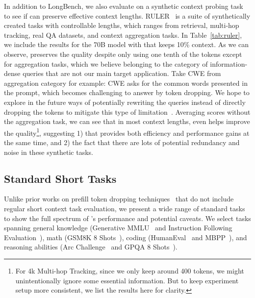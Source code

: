 In addition to LongBench, we also evaluate \ours{} on a synthetic context probing task to see if \ours{} can preserve effective context lengths. RULER~\cite{hsieh2024ruler} is a suite of synthetically created tasks with controllable lengths, which ranges from retrieval, multi-hop tracking, real QA datasets, and context aggregation tasks. In Table~\ref{tab:ruler}, we include the results for the 70B model with \ours{} that keeps 10\% context. As we can observe, \ours{} preserves the quality despite only using one tenth of the tokens except for aggregation tasks, which we believe belonging to the category of information-dense queries that are not our main target application. Take CWE from aggregation category for example: CWE asks for the common words presented in the prompt, which becomes challenging to answer by token dropping. We hope to explore in the future ways of potentially rewriting the queries instead of directly dropping the tokens to mitigate this type of limitation~\cite{jiang2023llmlinguacompressingpromptsaccelerated, jiang2024longllmlinguaacceleratingenhancingllms}. Averaging scores without the aggregation task, we can see that in most context lengths, \ours{} even helps improve the quality\footnote{For 4k Multi-hop Tracking, since we only keep around 400 tokens, we might unintentionally ignore some essential information. But to keep experiment setup more consistent, we list the results here for clarity. }, suggesting 1) that \ours{} provides both efficiency and performance gains at the same time, and 2) the fact that there are lots of potential redundancy and noise in these synthetic tasks. 

\subsection{Standard Short Tasks} 
\label{sec:standard}

Unlike prior works on prefill token dropping techniques~\cite{lv2024critiprefillsegmentwisecriticalitybasedapproach, shi2024discoveringgemsearlylayers} that do not include regular short context task evaluation, we present a wide range of standard tasks to show the full spectrum of \ours{}'s performance and potential caveats. We select tasks spanning general knowledge (Generative MMLU~\cite{hendrycks2021measuringmassivemultitasklanguage} and Instruction Following Evaluation~\cite{zhou2023instructionfollowing}), math (GSM8K 8 Shots~\cite{cobbe2021training}), coding (HumanEval~\cite{chen2021evaluatinglargelanguagemodels} and MBPP~\cite{austin2021programsynthesislargelanguage}), and reasoning abilities (Arc Challenge~\cite{Clark2018ThinkYH} and GPQA 8 Shots~\cite{rein2023gpqa}). 

